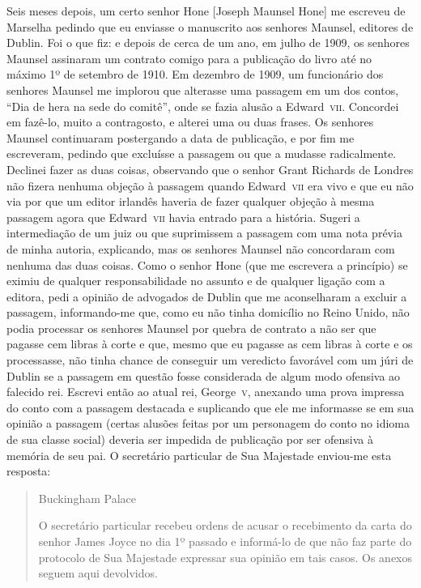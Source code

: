 Seis meses depois, um certo senhor Hone [Joseph Maunsel Hone] me escreveu de
Marselha pedindo que eu enviasse o manuscrito aos senhores Maunsel, editores de
Dublin. Foi o que fiz: e depois de cerca de um ano, em julho de 1909, os
senhores Maunsel assinaram um contrato comigo para a publicação do livro até no
máximo 1º de setembro de 1910. Em dezembro de 1909, um funcionário dos senhores
Maunsel me implorou que alterasse uma passagem em um dos contos,
``Dia de hera na sede do comitê'',
onde se fazia alusão a Edward~\textsc{vii}. Concordei em fazê-lo, muito a contragosto, e
alterei uma ou duas frases. Os senhores Maunsel continuaram postergando a data
de publicação, e por fim me escreveram, pedindo que excluísse a passagem ou que
a mudasse radicalmente. Declinei fazer as duas coisas, observando que o senhor
Grant Richards de Londres não fizera nenhuma objeção à passagem quando Edward~\textsc{vii} 
era vivo e que eu não via por que um editor irlandês haveria de fazer
qualquer objeção à mesma passagem agora que Edward~\textsc{vii} havia entrado para a
história. Sugeri a intermediação de um juiz ou que suprimissem a passagem com
uma nota prévia de minha autoria, explicando, mas os senhores Maunsel não
concordaram com nenhuma das duas coisas. Como o senhor Hone (que me escrevera a
princípio) se eximiu de qualquer responsabilidade no assunto e de qualquer
ligação com a editora, pedi a opinião de advogados de Dublin que me aconselharam
a excluir a passagem, informando-me que, como eu não tinha domicílio no Reino
Unido, não podia processar os senhores Maunsel por quebra de contrato a não ser
que pagasse cem libras à corte e que, mesmo que eu pagasse as cem libras à corte
e os processasse, não tinha chance de conseguir um veredicto favorável com um
júri de Dublin se a passagem em questão fosse considerada de algum modo ofensiva
ao falecido rei. Escrevi então ao atual rei, George~\textsc{v}, anexando uma prova
impressa do conto com a passagem destacada e suplicando que ele me informasse se
em sua opinião a passagem (certas alusões feitas por um personagem do conto no
idioma de sua classe social) deveria ser impedida de publicação por ser ofensiva
à memória de seu pai. O secretário particular de Sua Majestade enviou-me esta
resposta:

\begin{quote}
Buckingham Palace

O secretário particular recebeu ordens de acusar o recebimento da carta do senhor
James Joyce no dia 1º passado e informá-lo de que não faz parte do
protocolo de Sua Majestade expressar sua opinião em tais casos. Os anexos seguem
aqui devolvidos.
\end{quote}

